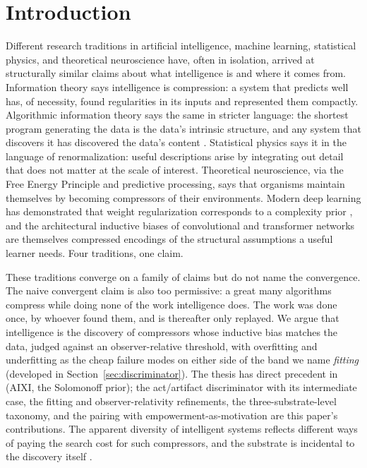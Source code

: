 \documentclass[11pt]{article}
\begin{document}
\section{Introduction}

Different research traditions in artificial intelligence, machine learning, statistical physics, and theoretical neuroscience have, often in isolation, arrived at structurally similar claims about what intelligence is and where it comes from. Information theory \citep{shannon1948} says intelligence is compression: a system that predicts well has, of necessity, found regularities in its inputs and represented them compactly. Algorithmic information theory says the same in stricter language: the shortest program generating the data is the data's intrinsic structure, and any system that discovers it has discovered the data's content \citep{solomonoff1964, kolmogorov1965}. Statistical physics says it in the language of renormalization: useful descriptions arise by integrating out detail that does not matter at the scale of interest. Theoretical neuroscience, via the Free Energy Principle and predictive processing, says that organisms maintain themselves by becoming compressors of their environments. Modern deep learning has demonstrated that weight regularization corresponds to a complexity prior \citep{hinton_vancamp_1993}, and the architectural inductive biases of convolutional \citep{lecun1989} and transformer networks are themselves compressed encodings of the structural assumptions a useful learner needs. Four traditions, one claim.

These traditions converge on a family of claims but do not name the convergence. The naive convergent claim is also too permissive: a great many algorithms compress while doing none of the work intelligence does. The work was done once, by whoever found them, and is thereafter only replayed. We argue that intelligence is the discovery of compressors whose inductive bias matches the data, judged against an observer-relative threshold, with overfitting and underfitting as the cheap failure modes on either side of the band we name \emph{fitting} (developed in Section~\ref{sec:discriminator}). The thesis has direct precedent in \citet{hutter2005} (AIXI, the Solomonoff prior); the act/artifact discriminator with its intermediate case, the fitting and observer-relativity refinements, the three-substrate-level taxonomy, and the pairing with empowerment-as-motivation are this paper's contributions. The apparent diversity of intelligent systems reflects different ways of paying the search cost for such compressors, and the substrate is incidental to the discovery itself \citep{gavrilov_emergence_2026}.
\end{document}
